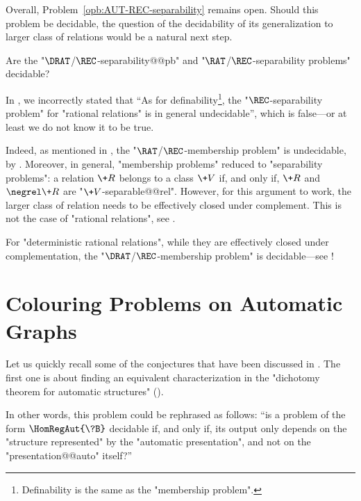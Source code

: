 Overall, Problem~\ref{opb:AUT-REC-separability} remains open.
Should this problem be decidable, the question of
the decidability of its generalization to larger class of relations would be
a natural next step.

\begin{openproblem}
	Are the "$\DRAT$/$\REC$-separability@@pb" and
	"$\RAT$/$\REC$-sepa\-ra\-bility problems" decidable?
\end{openproblem}

In \cite[\S~1]{BarceloFigueiraMorvan2023SeparatingAutomatic},
we incorrectly stated that ``As for definability\footnote{Definability is the same
as the "membership problem".}, the "$\REC$-separability problem" for "rational relations" is in general undecidable'', which is false---or at least we do not know it to be true.

Indeed, as mentioned in ,
the "$\RAT$/$\REC$-membership problem" is undecidable, by
\cite[\S~III, Theorem~8.4]{Berstel1979Transductions}.
Moreover, in general, "membership problems" reduced to "separability problems":
a relation $\+R$ belongs to a class $\+V$ if, and only if, $\+R$ and $\negrel \+R$
are "$\+V$-separable@@rel". However, for this argument to work, the larger class of relation
needs to be effectively closed under complement.
This is not the case of "rational relations", see .

For "deterministic rational relations", while they are effectively
closed under complementation, the "$\DRAT$/$\REC$-membership problem"
is decidable---see !

\section{Colouring Problems on Automatic Graphs}

Let us quickly recall some of the conjectures that have been discussed in .
The first one is about finding an equivalent characterization in the "dichotomy theorem
for automatic structures" ().

\conjInvarianceGraphIsomorphisms*

In other words, this problem could be rephrased as follows: ``is a problem
of the form $\HomRegAut{\?B}$ decidable if, and only if, its output
only depends on the "structure represented" by the "automatic presentation",
and not on the "presentation@@auto" itself?''

